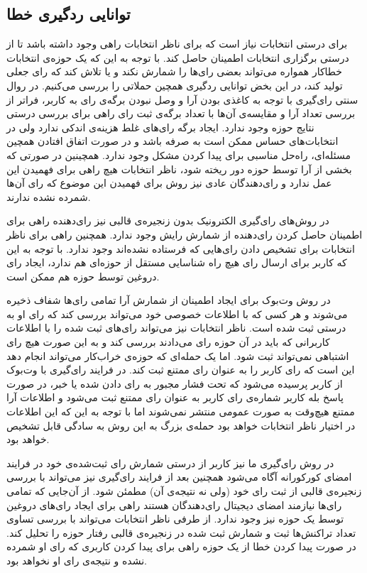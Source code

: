 \subsection{توانایی ردگیری خطا}
برای درستی انتخابات نیاز است که برای ناظر انتخابات راهی وجود داشته باشد تا از درستی برگزاری انتخابات اطمینان حاصل کند. با توجه به این که یک حوزه‌ی انتخابات خطاکار همواره می‌تواند بعضی رای‌ها را شمارش نکند و یا تلاش کند که رای جعلی تولید کند، در این بخض توانایی ردگیری همچین حملاتی را بررسی می‌کنیم.
در روال سنتی رای‌گیری با توجه به کاغذی بودن آرا و وصل نبودن برگه‌ی رای به کاربر، فراتر از بررسی تعداد آرا و مقایسه‌ی آن‌ها با تعداد برگه‌ی ثبت رای راهی برای بررسی درستی نتایج حوزه وجود ندارد. ایجاد برگه‌ رای‌های غلط هزینه‌ی اندکی ندارد ولی در انتخابات‌های حساس ممکن است به صرفه باشد و در صورت اتفاق افتادن همچین مسئله‌ای، راه‌حل مناسبی برای پیدا کردن مشکل وجود ندارد. همچینین در صورتی که بخشی از آرا توسط حوزه دور ریخته شود، ناظر انتخابات هیچ راهی برای فهمیدن این عمل ندارد و رای‌دهندگان عادی نیز روش برای فهمیدن این موضوع که رای آن‌ها شمرده نشده ندارند.
\par 
در روش‌های رای‌گیری الکترونیک بدون زنجیره‌ی قالبی نیز رای‌دهنده راهی برای اطمینان حاصل کردن رای‌‌دهنده از شمارش رایش وجود ندارد. همچنین راهی برای ناظر انتخابات برای تشخیص دادن رای‌هایی که فرستاده نشده‌اند وجود ندارد. با توجه به این که کاربر برای ارسال رای هیچ راه شناسایی مستقل از حوزه‌ای هم ندارد، ایجاد رای دروغین توسط حوزه هم ممکن است. 
\par 
در روش‌ وت‌بوک برای ایجاد اطمینان از شمارش آرا تمامی رای‌ها شفاف ذخیره می‌شوند و هر کسی که با اطلاعات خصوصی خود می‌تواند بررسی کند که رای او به درستی ثبت شده است. ناظر انتخابات نیز می‌تواند رای‌های ثبت شده را با اطلاعات کاربرانی که باید در آن حوزه رای می‌دادند بررسی کند و به این صورت هیچ رای اشتباهی نمی‌تواند ثبت شود. اما یک حمله‌ای که حوزه‌ی خراب‌کار می‌تواند انجام دهد این است که رای کاربر را به عنوان رای ممتنع ثبت کند. در فرایند رای‌گیری با وت‌بوک از کاربر پرسیده می‌شود که تحت فشار مجبور به رای دادن شده یا خبر، در صورت پاسخ بله کاربر شماره‌ی رای کاربر به عنوان رای ممتنع ثبت می‌شود و اطلاعات آرا ممتنع هیچ‌وقت به صورت عمومی منتشر نمی‌شوند اما با توجه به این که این اطلاعات در اختیار ناظر انتخابات خواهد بود حمله‌‌ی بزرگ به این روش به سادگی قابل تشخیص خواهد بود. 
\par 
در روش رای‌گیری ما نیز کاربر از درستی شمارش رای‌ ثبت‌شده‌ی خود در فرایند امضای کورکورانه آگاه می‌شود همچنین بعد از فرایند رای‌گیری نیز می‌تواند با بررسی زنجیره‌ی قالبی از ثبت رای‌ خود (ولی نه نتیجه‌ی آن) مطمئن شود. از آن‌جایی که تمامی رای‌ها نیازمند امضای دیجیتال رای‌دهندگان هستند راهی برای ایجاد رای‌های دروغین توسط یک حوزه نیز وجود ندارد. از طرفی ناظر انتخابات می‌تواند با بررسی تساوی تعداد تراکنش‌ها ثبت و شمارش ثبت شده در زنجیره‌ی قالبی رفتار حوزه را تحلیل کند. در صورت پیدا کردن خطا از یک حوزه راهی برای پیدا کردن کاربری که رای او شمرده نشده و نتیجه‌ی رای او نخواهد بود.



